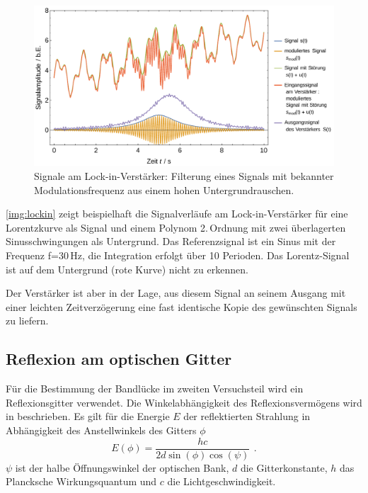 \begin{figure}[H]
\begin{center}
  \includegraphics[width=\textwidth]{../img/lockin.pdf}
  \caption{Signale am Lock-in-Verstärker: Filterung eines Signals mit bekannter Modulationsfrequenz
  aus einem hohen Untergrundrauschen.}
  \label{img:lockin}
\end{center}
\end{figure}

\autoref{img:lockin} zeigt beispielhaft die Signalverläufe am Lock-in-Verstärker für
eine Lorentzkurve als Signal und einem Polynom 2.\,Ordnung mit zwei überlagerten Sinusschwingungen als Untergrund.
Das Referenzsignal ist ein Sinus mit der Frequenz f=30\,Hz, die Integration erfolgt über 10 Perioden.
Das Lorentz-Signal ist auf dem Untergrund (rote Kurve) nicht zu erkennen.

Der Verstärker ist aber in der Lage, aus diesem Signal
an seinem Ausgang mit einer leichten Zeitverzögerung
eine fast identische Kopie des gewünschten Signals zu liefern.


\subsection{Reflexion am optischen Gitter}
Für die Bestimmung der Bandlücke im zweiten Versuchsteil wird ein Reflexionsgitter verwendet.
Die Winkelabhängigkeit des Reflexionsvermögens wird in \cite{staatsex} beschrieben. Es gilt
für die Energie $E$ der reflektierten Strahlung in Abhängigkeit des Anstellwinkels des Gitters $\phi$
\begin{equation}
\label{}
E(\phi)=\frac{h c}{2 d \sin(\phi) \cos (\psi)} \ \, .
\end{equation}
$\psi$ ist der halbe Öffnungswinkel der optischen Bank, $d$ die Gitterkonstante,
$h$ das Plancksche Wirkungsquantum und $c$ die Lichtgeschwindigkeit.


